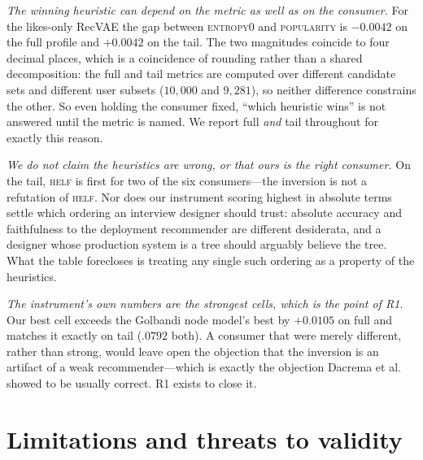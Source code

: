 \documentclass[11pt]{article}
\begin{document}
\emph{The winning heuristic can depend on the metric as well as on the consumer.} For the likes-only RecVAE the
gap between \textsc{entropy0} and \textsc{popularity} is $-0.0042$ on the full profile and $+0.0042$ on the
tail. The two magnitudes coincide to four decimal places, which is a coincidence of rounding rather than a
shared decomposition: the full and tail metrics are computed over different candidate sets and different user
subsets ($10{,}000$ and $9{,}281$), so neither difference constrains the other. So even holding the consumer
fixed, ``which heuristic wins'' is not answered until the metric is named. We report full \emph{and} tail
throughout for exactly this reason.

\emph{We do not claim the heuristics are wrong, or that ours is the right consumer.} On the tail, \textsc{helf} is
first for two of the six consumers---the inversion is not a refutation of \textsc{helf}. Nor does our instrument
scoring highest in absolute terms settle which ordering an interview designer should trust: absolute accuracy and
faithfulness to the deployment recommender are different desiderata, and a designer whose production system is a
tree should arguably believe the tree. What the table forecloses is treating any single such ordering as a
property of the heuristics.

\emph{The instrument's own numbers are the strongest cells, which is the point of R1.} Our best cell exceeds the
Golbandi node model's best by $+0.0105$ on full and matches it exactly on tail ($.0792$ both). A consumer that were merely
different, rather than strong, would leave open the objection that the inversion is an artifact of a weak
recommender---which is exactly the objection Dacrema et al.~\cite{dacrema2019progress} showed to be usually
correct. R1 exists to close it.

\FloatBarrier
\section{Limitations and threats to validity}\label{sec:limits}
\end{document}
